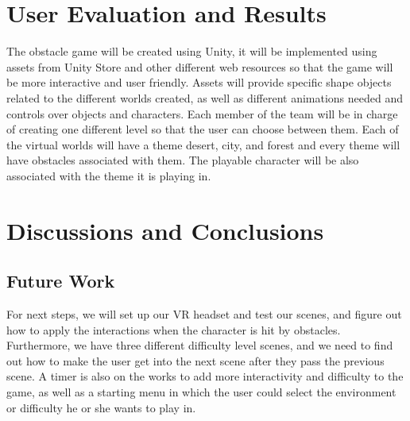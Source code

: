 \documentclass{vgtc}                          %
\begin{document}
\section{User Evaluation and Results}

The obstacle game will be created using Unity, it will be implemented using assets from Unity Store and other different web resources so that the game will be more interactive and user friendly. Assets will provide specific shape objects related to the different worlds created, as well as different animations needed and controls over objects and characters.
Each member of the team will be in charge of creating one different level so that the user can choose between them. Each of the virtual worlds will have a theme desert, city, and forest and every theme will have obstacles associated with them. The playable character will be also associated with the theme it is playing in.


\section{Discussions and Conclusions}

\subsection{Future Work}

For next steps, we will set up our VR headset and test our scenes, and figure out how to apply the interactions when the character is hit by obstacles. Furthermore, we have three different difficulty level scenes, and we need to find out how to make the user get into the next scene after they pass the previous scene.
A timer is also on the works to add more interactivity and difficulty to the game, as well as a starting menu in which the user could select the environment or difficulty he or she wants to play in.


%

%
%
%


\end{document}

